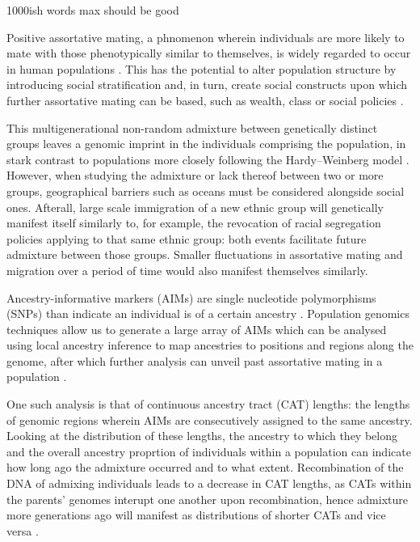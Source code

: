 \documentclass[11pt]{article}
\begin{document}
 \parencite{}


1000ish words max should be good

Positive assortative mating, a phnomenon wherein individuals are more likely to mate with those phenotypically similar to themselves, is widely regarded to occur in human populations \parencite{Norris2019}. This has the potential to alter population structure by introducing social stratification and, in turn, create social constructs upon which further assortative mating can be based, such as wealth, class or social policies \parencite{Risch2009}.

This multigenerational non-random admixture between genetically distinct groups leaves a genomic imprint in the individuals comprising the population, in stark contrast to populations more closely following the Hardy–Weinberg model \parencite{Zaitlen2017}. However, when studying the admixture or lack thereof between two or more groups, geographical barriers such as oceans must be considered alongside social ones. Afterall, large scale immigration of a new ethnic group will genetically manifest itself similarly to, for example, the revocation of racial segregation policies applying to that same ethnic group: both events facilitate future admixture between those groups. Smaller fluctuations in assortative mating and migration over a period of time would also manifest themselves similarly.

Ancestry-informative markers (AIMs) are single nucleotide polymorphisms (SNPs) than indicate an individual is of a certain ancestry \parencite{Risch2009}. Population genomics techniques allow us to generate a large array of AIMs which can be analysed using local ancestry inference to map ancestries to positions and regions along the genome, after which further analysis can unveil past assortative mating in a population \parencite{Schubert2020}.

One such analysis is that of continuous ancestry tract (CAT) lengths: the lengths of genomic regions wherein AIMs are consecutively assigned to the same ancestry. Looking at the distribution of these lengths, the ancestry to which they belong and the overall ancestry proprtion of individuals within a population can indicate how long ago the admixture occurred and to what extent. Recombination of the DNA of admixing individuals leads to a decrease in CAT lengths, as CATs within the parents' genomes interupt one another upon recombination, hence admixture more generations ago will manifest as distributions of shorter CATs and vice versa \parencite{Gravel2012}. 
\end{document}
